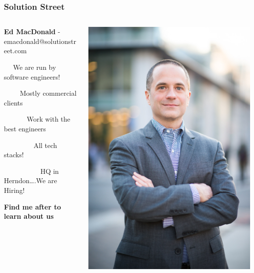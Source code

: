     \begin{frame}[label=loto]
        \frametitle{Solution Street}
        \begin{columns}
            \begin{column}{0.75\textwidth}
                \textbf{Ed MacDonald} - emacdonald@solutionstreet.com

                \vspace{1em}

                ~~ We are run by software engineers!

                ~~~~ Mostly commercial clients

                ~~~~~~ Work with the best engineers

                ~~~~~~~~ All tech stacks!

                ~~~~~~~~~~ HQ in Herndon….We are Hiring!

                \vspace{1em}

                \textbf{Find me after to learn about us}
            \end{column}
            \begin{column}{0.25\textwidth}
                \includegraphics[width=\textwidth,height=0.85\textheight,keepaspectratio]{graphics/Headshot}
            \end{column}
        \end{columns}
    \end{frame}

